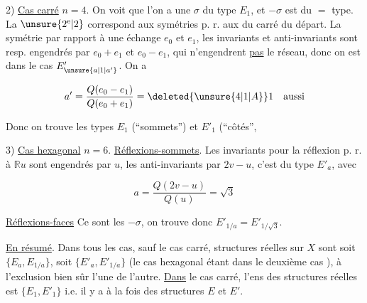 
2) \uline{Cas carré} $n=4$. On voit que l'on a une $\sigma$ du type $E_1$, et $-\sigma$ est du $=$ type. La $\unsure{2^{\mathrm e}|2}$ correspond aux symétries p. r. aux   du carré du départ. La symétrie par rapport à une  échange $e_0$ et $e_1$, les invariants et anti-invariants sont resp. engendrés par $e_0+e_1$ et $e_0-e_1$, qui n'engendrent \uline{pas} le réseau, donc on est dans le cas $E'_{\unsure{a|1|a'}}$. On a



\[
a'=\frac{Q(e_0-e_1)}{Q(e_0+e_1)}=\deleted{\unsure{4|1|A}}1\quad\text{aussi}
\]

Donc on trouve les types $E_1$ (``sommets'') et $E'_1$ (``côtés'',

3) \uline{Cas hexagonal} $n=6$.  \uline{Réflexions-sommets}. Les  invariants pour la réflexion p. r. à $\mathbb R u$ sont engendrés par $u$, les anti-invariants par $2v-u$, c'est du type $E'_a$, avec


\[
a=\frac{Q(2v-u)}{Q(u)}=\sqrt{3}
\]

\uline{Réflexions-faces} Ce sont les $-\sigma$, on trouve donc $E'_{1/a}=E'_{1/\sqrt{3}}$.

\uline{En résumé}. Dans tous les cas, sauf le cas carré,     structures réelles sur $X$ sont soit  $\{E_a,E_{1/a}\}$,  soit $\{E'_a,E'_{1/a}\}$  (le cas hexagonal étant dans le deuxième cas ), à l'exclusion bien sûr l'une de l'autre. \uline{Dans} le cas carré, l'ens des structures réelles est $\{E_1,E'_1\}$ i.e. il y a à la fois des structures $E$ et $E'$.

